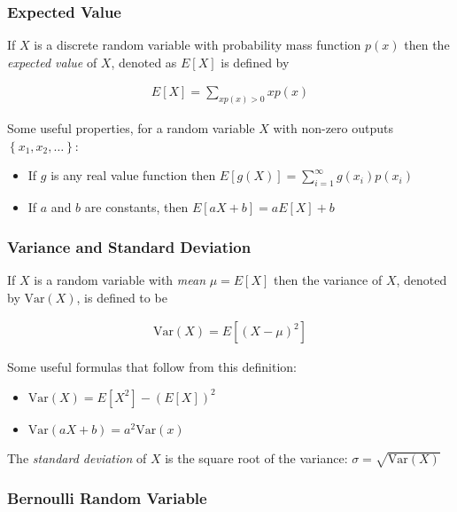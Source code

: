\documentclass[10pt]{article}
\begin{document}
		\subsubsection*{Expected Value}
		
		If $X$ is a discrete random variable with probability mass function $p(x)$ then the \emph{expected value} of $X$, denoted as $E[X]$ is defined by
		
		\begin{align*}
			E[X] = \sum_{xp(x)>0}xp(x)
		\end{align*}
		
		\noindent Some useful properties, for a random variable $X$ with non-zero outputs $\left\{ x_1, x_2, \ldots \right\}$: 
		
		\begin{itemize}
			\item If $g$ is any real value function then $E[g(X)] =  \sum_{i=1}^{\infty}g(x_i)p(x_i)$
			\item If $a$ and $b$ are constants, then $E[aX+b] = aE[X] + b $
		\end{itemize}
		
		\subsubsection*{Variance and Standard Deviation}
		
		If $X$ is a random variable with \emph{mean} $\mu=E[X]$ then the variance of $X$, denoted by $\text{Var}(X)$, is defined to be
		
		\begin{align*}
			\text{Var}(X) = E[(X-\mu)^2]
		\end{align*}
		
		\noindent Some useful formulas that follow from this definition:
		\begin{multicols}{2}
			\begin{itemize}
				\item $\text{Var}(X) = E[X^2] - (E[X])^2$
				\item $\text{Var}(aX + b) = a^2 \text{Var}(x)$
			\end{itemize}
		\end{multicols}
		
		\noindent The \emph{standard deviation} of $X$ is the square root of the variance: $\sigma = \sqrt{\text{Var}(X)}$
		
		\subsubsection*{Bernoulli  Random Variable}
		
\end{document}
